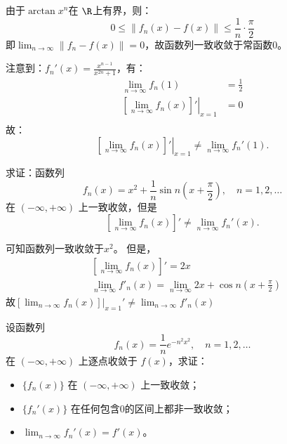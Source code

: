 \begin{solution}
    由于\(\arctan x^{n}\)在 \(\R\)上有界，则：
    \[
        0 \le  \left\lVert f_{n}(x) - f(x) \right\rVert \le
        \frac{1}{n} \cdot \frac{\pi}{2}
    \]
    即\(\lim_{n \to \infty} \left\lVert f_{n} - f(x) \right\rVert =
    0\)，故函数列一致收敛于常函数\(0\)。

    注意到：\(f_{n}'(x) = \frac{x^{n - 1}}{x^{2n} + 1}\)，有：
    \begin{align*}
        \lim_{n \to \infty} f_{n}(1) & = \frac{1}{2} \\
        \left. \left[ \lim_{n \to \infty} f_{n}(x) \right]'
        \right|_{x=1}                & = 0           \\
    \end{align*}
    故： \[
        \left. \left[ \lim_{n \to \infty} f_n(x) \right]'
        \right|_{x = 1}
        \neq \lim_{n \to \infty} f_n'(1).
    \]
\end{solution}

\begin{problem}
    求证：函数列
    \[
        f_n(x) = x^2 + \frac{1}{n} \sin n \left( x + \frac{\pi}{2}
        \right), \quad n = 1, 2, \dots
    \]
    在 \((-\infty, +\infty)\) 上一致收敛，但是
    \[
        \left[ \lim_{n \to \infty} f_n(x) \right]' \neq \lim_{n \to
        \infty} f_n'(x).
    \]
\end{problem}

\begin{solution}
    可知函数列一致收敛于\(x^{2}\)。
    但是，
    \begin{align*}
        & \left[ \lim_{n \to \infty} f_{n}(x) \right]' = 2x        \\
        & \lim_{n \to \infty} f'_{n}(x) = \lim_{n \to \infty} 2x +
        \cos n \left( x + \frac{\pi}{2} \right)
    \end{align*}
    故\(\left.\left[ \lim_{n \to \infty} f_n(x) \right]\right|_{x=1}'
        \neq \lim_{n \to
    \infty} f'_{n}(x)\)
\end{solution}

\begin{problem}
    设函数列
    \[
        f_n(x) = \frac{1}{n} e^{-n^2 x^2}, \quad n = 1, 2, \dots
    \]
    在 \((-\infty, +\infty)\) 上逐点收敛于 \(f(x)\)，求证：
    \begin{itemize}
        \item \(\{f_n(x)\}\) 在 \((-\infty, +\infty)\) 上一致收敛；
        \item \(\{f_n'(x)\}\) 在任何包含0的区间上都非一致收敛；
        \item \(\lim_{n \to \infty} f_n'(x) = f'(x)\)。
    \end{itemize}
\end{problem}

